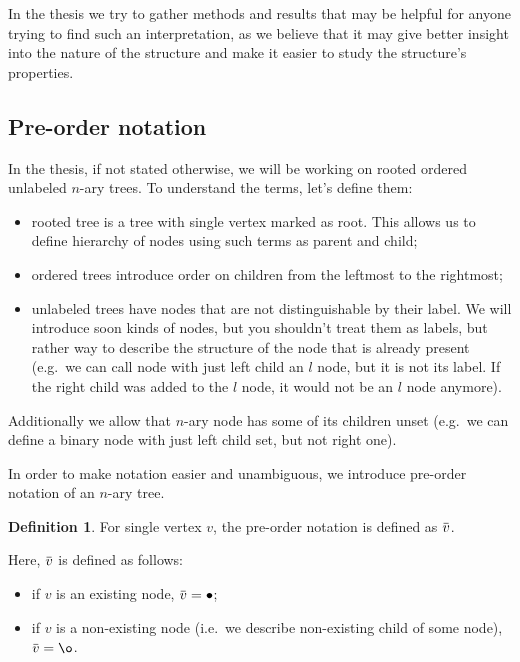 \documentclass[final]{article}
\theoremstyle{definition}
\newtheorem{definition}{Definition}[subsection]
\theoremstyle{definition}
\theoremstyle{remark}
\newcommand{\ols}[1]{\mskip.5\thinmuskip\overline{\mskip-.5\thinmuskip {#1} \mskip-.5\thinmuskip}\mskip.5\thinmuskip} %
\newcommand{\enc}[1]{\ensuremath{\ols{#1}}}
\DeclareMathOperator{\n}{\bullet}
\DeclareMathOperator{\no}{\o}
\begin{document}
In the thesis we try to gather methods and results that may be helpful for anyone trying to find such an interpretation, as we believe that it may give better insight into the nature of the structure and make it easier to study the structure's properties.

\subsection{Pre-order notation}%
\label{sub:pre_order_notation}

In the thesis, if not stated otherwise, we will be working on rooted ordered unlabeled \(n\)-ary trees. To understand the terms, let's define them:
\begin{itemize}
    \item rooted tree is a tree with single vertex marked as root. This allows us to define hierarchy of nodes using such terms as parent and child;
    \item ordered trees introduce order on children from the leftmost to the rightmost;
    \item unlabeled trees have nodes that are not distinguishable by their label. We will introduce soon kinds of nodes, but you shouldn't treat them as labels, but rather way to describe the structure of the node that is already present (e.g.\ we can call node with just left child an \(l\) node, but it is not its label. If the right child was added to the \(l\) node, it would not be an \(l\) node anymore).
\end{itemize}
Additionally we allow that \(n\)-ary node has some of its children unset (e.g.\ we can define a binary node with just left child set, but not right one).

In order to make notation easier and unambiguous, we introduce pre-order notation of an \(n\)-ary tree.

\begin{definition}
    For single vertex \(v\), the pre-order notation is defined as \(\enc{v}\).
\end{definition}

Here, \(\enc{v}\) is defined as follows:
\begin{itemize}
    \item if \(v\) is an existing node, \(\enc{v} = \n\);
    \item if \(v\) is a non-existing node (i.e.\ we describe non-existing child of some node), \(\enc{v} = \no\).
\end{itemize}
\end{document}
